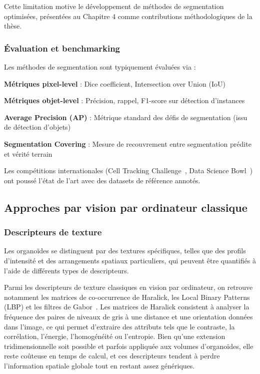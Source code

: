 Cette limitation motive le développement de méthodes de segmentation optimisées, présentées au Chapitre 4 comme contributions méthodologiques de la thèse.

\subsubsection{Évaluation et benchmarking}

Les méthodes de segmentation sont typiquement évaluées via :

\textbf{Métriques pixel-level} : Dice coefficient, Intersection over Union (IoU)

\textbf{Métriques objet-level} : Précision, rappel, F1-score sur détection d'instances

\textbf{Average Precision (AP)} : Métrique standard des défis de segmentation (issu de détection d'objets)

\textbf{Segmentation Covering} : Mesure de recouvrement entre segmentation prédite et vérité terrain

Les compétitions internationales (Cell Tracking Challenge~\cite{Ulman2017}, Data Science Bowl~\cite{Caicedo2019}) ont poussé l'état de l'art avec des datasets de référence annotés.

\subsection{Approches par vision par ordinateur classique}

\subsubsection{Descripteurs de texture}

Les organoïdes se distinguent par des textures spécifiques, telles que des profils d’intensité et des arrangements spatiaux particuliers, qui peuvent être quantifiés à l’aide de différents types de descripteurs.

Parmi les descripteurs de texture classiques en vision par ordinateur, on retrouve notamment les matrices de co-occurrence de Haralick, les Local Binary Patterns (LBP) et les filtres de Gabor~\cite{Haralick1973, Ojala2002, Fogel1989}. Les matrices de Haralick consistent à analyser la fréquence des paires de niveaux de gris à une distance et une orientation données dans l’image, ce qui permet d’extraire des attributs tels que le contraste, la corrélation, l’énergie, l’homogénéité ou l’entropie. Bien qu’une extension tridimensionnelle soit possible et parfois appliquée aux volumes d’organoïdes, elle reste coûteuse en temps de calcul, et ces descripteurs tendent à perdre l’information spatiale globale tout en restant assez génériques.

